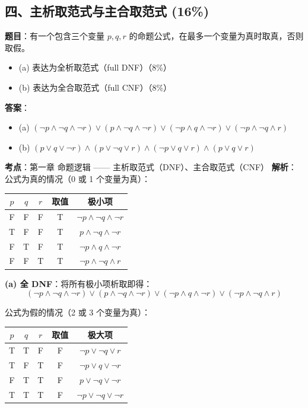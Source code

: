 \documentclass[10pt,a4paper,openany]{ctexbook}
\theoremstyle{definition}
\theoremstyle{remark}
\begin{document}
\vspace{-2pt}

\subsection{四、主析取范式与主合取范式 (16\%)}

\textbf{题目}：有一个包含三个变量 $p, q, r$ 的命题公式，在最多一个变量为真时取真，否则取假。
\begin{itemize}
\item (a) 表达为全析取范式（full DNF）（8\%）
\item (b) 表达为全合取范式（full CNF）（8\%）

\end{itemize}

\textbf{答案}：
\begin{itemize}
\item (a) $(\neg p \land \neg q \land \neg r) \lor (p \land \neg q \land \neg r) \lor (\neg p \land q \land \neg r) \lor (\neg p \land \neg q \land r)$
\item (b) $(p \lor q \lor \neg r) \land (p \lor \neg q \lor r) \land (\neg p \lor q \lor r) \land (p \lor q \lor r)$

\end{itemize}

\textbf{考点}：第一章 命题逻辑 —— 主析取范式（DNF）、主合取范式（CNF）
\textbf{解析}：
公式为真的情况（0 或 1 个变量为真）：
\begin{center}
\begin{tabular}{ccccc}
\hline
$p$ & $q$ & $r$ & 取值 & 极小项 \\ \hline
F & F & F & T & $\neg p \land \neg q \land \neg r$ \\
T & F & F & T & $p \land \neg q \land \neg r$ \\
F & T & F & T & $\neg p \land q \land \neg r$ \\
F & F & T & T & $\neg p \land \neg q \land r$ \\
\hline
\end{tabular}

\end{center}

\textbf{(a) 全 DNF}：将所有极小项析取即得：
\[
(\neg p \land \neg q \land \neg r) \lor (p \land \neg q \land \neg r) \lor (\neg p \land q \land \neg r) \lor (\neg p \land \neg q \land r)
\]

公式为假的情况（2 或 3 个变量为真）：
\begin{center}
\begin{tabular}{ccccc}
\hline
$p$ & $q$ & $r$ & 取值 & 极大项 \\ \hline
T & T & F & F & $\neg p \lor \neg q \lor r$ \\
T & F & T & F & $\neg p \lor q \lor \neg r$ \\
F & T & T & F & $p \lor \neg q \lor \neg r$ \\
T & T & T & F & $\neg p \lor \neg q \lor \neg r$ \\
\hline
\end{tabular}

\end{center}
\end{document}
